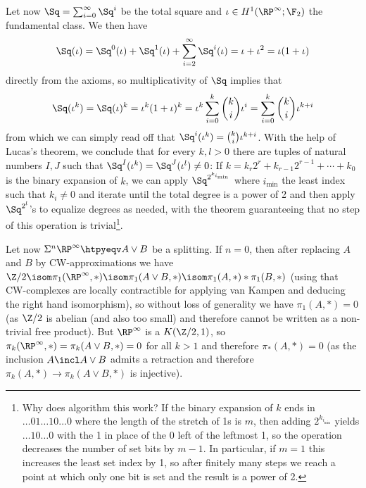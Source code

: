 \begin{solution}
	Let now $\Sq = \sum_{i = 0}^\infty \Sq^i$ be the total square and $\iota \in H^1(\RP^\infty; \F_2)$ the fundamental class.
	We then have
	\begin{equation*}
		\Sq(\iota) = \Sq^0(\iota) + \Sq^1(\iota) + \sum_{i = 2}^\infty \Sq^i(\iota) = \iota + \iota^2 = \iota (1 + \iota)
	\end{equation*}
	directly from the axioms, so multiplicativity of $\Sq$ implies that
	\begin{equation*}
		\Sq(\iota^k) = \Sq(\iota)^k = \iota^k (1 + \iota)^k = \iota^k \sum_{i = 0}^k \binom{k}{i} \iota^i = \sum_{i = 0}^k \binom{k}{i} \iota^{k + i}
	\end{equation*}
	from which we can simply read off that $\Sq^i(\iota^k) = \binom{k}{i} \iota^{k + i}$.
	With the help of Lucas's theorem, we conclude that for every $k, l > 0$ there are tuples of natural numbers $I, J$ such that $\Sq^I(\iota^k) = \Sq^J(\iota^l) \neq 0$:
	If $k = k_r 2^r + k_{r - 1} 2^{r - 1} + \cdots + k_0$ is the binary expansion of $k$, we can apply $\Sq^{2^{k_{i_\text{min}}}}$ where $i_\text{min}$ the least index such that $k_i \neq 0$ and iterate until the total degree is a power of 2 and then apply $\Sq^{2^l}$'s to equalize degrees as needed, with the theorem guaranteeing that no step of this operation is trivial\footnote{Why does algorithm this work? If the binary expansion of $k$ ends in $\ldots 01 \ldots 10 \ldots 0$ where the length of the stretch of 1s is $m$, then adding $2^{k_{i_\text{min}}}$ yields $\ldots 1 0 \ldots 0$ with the 1 in place of the 0 left of the leftmost 1, so the operation decreases the number of set bits by $m - 1$. In particular, if $m = 1$ this increases the least set index by 1, so after finitely many steps we reach a point at which only one bit is set and the result is a power of 2.}.

	Let now $\Sigma^n \RP^\infty \htpyeqv A \vee B$ be a splitting.
	If $n = 0$, then after replacing $A$ and $B$ by CW-approximations we have $\Zn{2} \isom \pi_1(\RP^\infty, *) \isom \pi_1(A \vee B, *) \isom \pi_1(A, *) \ast \pi_1(B, *)$ (using that CW-complexes are locally contractible for applying van Kampen and deducing the right hand isomorphism), so without loss of generality we have $\pi_1(A, *) = 0$ (as $\Zn{2}$ is abelian (and also too small) and therefore cannot be written as a non-trivial free product).
	But $\RP^\infty$ is a $K(\Zn{2}, 1)$, so $\pi_k(\RP^\infty, *) = \pi_k(A \vee B, *) = 0$ for all $k > 1$ and therefore $\pi_*(A, *) = 0$ (as the inclusion $A \incl A \vee B$ admits a retraction and therefore $\pi_k(A, *) \to \pi_k(A \vee B, *)$ is injective).
	

\end{solution}
